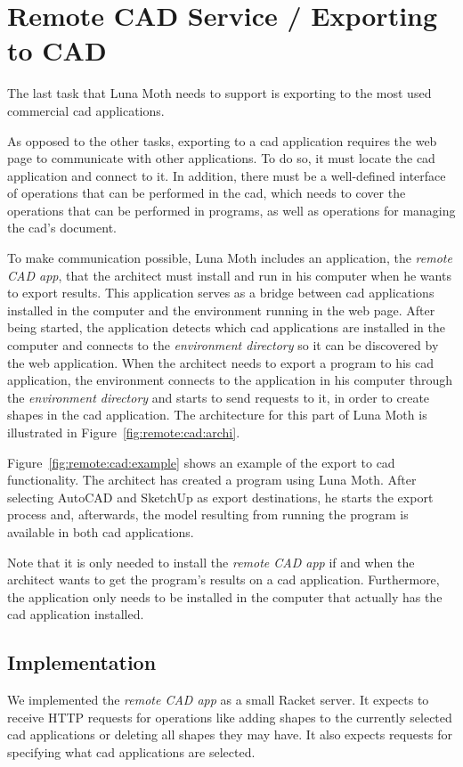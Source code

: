 \section{Remote CAD Service / Exporting to CAD}
\label{sec:sol:remote}
The last task that Luna Moth needs to support is exporting to the most used commercial \gls{cad} applications.

As opposed to the other tasks, exporting to a \gls{cad} application requires the web page to communicate with other applications.
To do so, it must locate the \gls{cad} application and connect to it.
In addition, there must be a well-defined interface of operations that can be performed in the \gls{cad}, which needs to cover the operations that can be performed in programs, as well as operations for managing the \gls{cad}'s document.

To make communication possible, Luna Moth includes an application, the \textit{remote CAD app}, that the architect must install and run in his computer when he wants to export results.
This application serves as a bridge between \gls{cad} applications installed in the computer and the environment running in the web page.
After being started, the application detects which \gls{cad} applications are installed in the computer and connects to the \textit{environment directory} so it can be discovered by the web application.
When the architect needs to export a program to his \gls{cad} application, the environment connects to the application in his computer through the \textit{environment directory} and starts to send requests to it, in order to create shapes in the \gls{cad} application.
The architecture for this part of Luna Moth is illustrated in Figure~\ref{fig:remote:cad:archi}.

Figure~\ref{fig:remote:cad:example} shows an example of the export to \gls{cad} functionality.
The architect has created a program using Luna Moth.
After selecting AutoCAD and SketchUp as export destinations, he starts the export process and, afterwards, the model resulting from running the program is available in both \gls{cad} applications.

Note that it is only needed to install the \textit{remote CAD app} if and when the architect wants to get the program's results on a \gls{cad} application.
Furthermore, the application only needs to be installed in the computer that actually has the \gls{cad} application installed.


\subsection{Implementation}
We implemented the \textit{remote CAD app} as a small Racket server.
It expects to receive HTTP requests for operations like adding shapes to the currently selected \gls{cad} applications or deleting all shapes they may have.
It also expects requests for specifying what \gls{cad} applications are selected.

